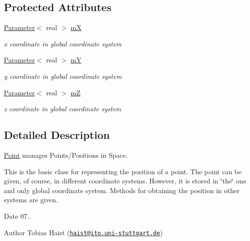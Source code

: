 \subsection*{Protected Attributes}
\begin{DoxyCompactItemize}
\item 
\hyperlink{classParameter}{Parameter}$<$ real $>$ \hyperlink{classPoint_acbee7418f6236b827d9dccd1d37b39fb}{mX}\hypertarget{classPoint_acbee7418f6236b827d9dccd1d37b39fb}{}\label{classPoint_acbee7418f6236b827d9dccd1d37b39fb}

\begin{DoxyCompactList}\small\item\em x coordinate in global coordinate system \end{DoxyCompactList}\item 
\hyperlink{classParameter}{Parameter}$<$ real $>$ \hyperlink{classPoint_a3503cea70b25f3746ff4e3e9282248a0}{mY}\hypertarget{classPoint_a3503cea70b25f3746ff4e3e9282248a0}{}\label{classPoint_a3503cea70b25f3746ff4e3e9282248a0}

\begin{DoxyCompactList}\small\item\em y coordinate in global coordinate system \end{DoxyCompactList}\item 
\hyperlink{classParameter}{Parameter}$<$ real $>$ \hyperlink{classPoint_a55932304ba34c80cf489a3b374dab965}{mZ}\hypertarget{classPoint_a55932304ba34c80cf489a3b374dab965}{}\label{classPoint_a55932304ba34c80cf489a3b374dab965}

\begin{DoxyCompactList}\small\item\em z coordinate in global coordinate system \end{DoxyCompactList}\end{DoxyCompactItemize}


\subsection{Detailed Description}
\hyperlink{classPoint}{Point} manages Points/\+Positions in Space. 

This is the basic class for representing the position of a point. The point can be given, of course, in different coordinate systems. However, it is stored in \char`\"{}the\char`\"{} one and only global coordinate system. Methods for obtaining the position in other systems are given.

\begin{DoxyDate}{Date}
07.. 
\end{DoxyDate}
\begin{DoxyAuthor}{Author}
Tobias Haist (\href{mailto:haist@ito.uni-stuttgart.de}{\tt haist@ito.\+uni-\/stuttgart.\+de}) 
\end{DoxyAuthor}


